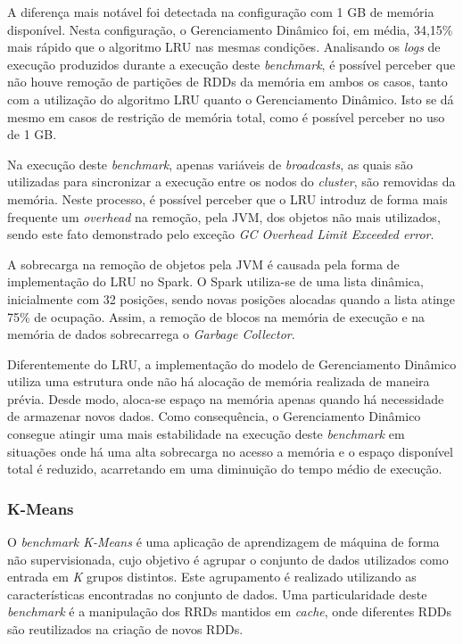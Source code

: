 A diferença mais notável foi detectada na configuração com 1 GB de memória disponível. Nesta configuração, o Gerenciamento Dinâmico foi, em média, 34,15\% mais rápido que o algoritmo LRU nas mesmas condições. Analisando os \textit{logs} de execução produzidos durante a execução deste \textit{benchmark}, é possível perceber que não houve remoção de partições de RDDs da memória em ambos os casos, tanto com a utilização do algoritmo LRU quanto o Gerenciamento Dinâmico. Isto se dá mesmo em casos de restrição de memória total, como é possível perceber no uso de 1 GB. 

Na execução deste \textit{benchmark}, apenas variáveis de \textit{broadcasts}, as quais são utilizadas para sincronizar a execução entre os nodos do \textit{cluster}, são removidas da memória. Neste processo, é possível perceber que o LRU introduz de forma mais frequente um \textit{overhead} na remoção, pela JVM, dos objetos não mais utilizados, sendo este fato demonstrado pelo exceção \textit{GC Overhead Limit Exceeded error}. 

A sobrecarga na remoção de objetos pela JVM é causada pela forma  de implementação do LRU no Spark. O Spark utiliza-se de uma lista dinâmica, inicialmente com 32 posições, sendo novas posições alocadas quando a lista atinge 75\% de ocupação. Assim, a remoção de blocos na memória de execução e na memória de dados sobrecarrega o \textit{Garbage Collector}. 

Diferentemente do LRU, a implementação do modelo de Gerenciamento Dinâmico utiliza uma estrutura onde não há alocação de memória realizada de maneira prévia. Desde modo, aloca-se espaço na memória apenas quando há 
necessidade de armazenar novos dados. Como consequência, o Gerenciamento Dinâmico consegue atingir uma mais estabilidade na execução deste \textit{benchmark} em situações onde há uma alta sobrecarga no acesso a memória e o espaço disponível total é reduzido, acarretando em uma diminuição do tempo médio de execução.

\subsubsection{K-Means}
O \textit{benchmark K-Means} é uma aplicação de aprendizagem de máquina de forma não supervisionada, cujo objetivo é agrupar o conjunto de dados utilizados como entrada em \textit{K} grupos distintos. Este agrupamento é realizado utilizando as características encontradas no conjunto de dados. Uma particularidade deste \textit{benchmark} é a manipulação dos RRDs mantidos em \textit{cache}, onde diferentes RDDs são reutilizados na criação de novos RDDs.

